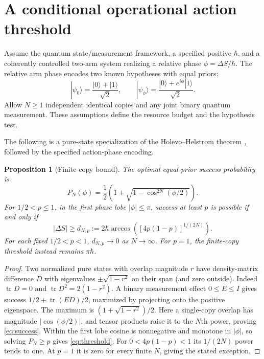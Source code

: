 \documentclass[11pt,a4paper]{article}
\newtheorem{proposition}{Proposition}
\begin{document}
\section{A conditional operational action threshold}
Assume the quantum state/measurement framework, a specified positive $\hbar$,
and a coherently controlled two-arm system realizing a relative phase
$\phi=\Delta S/\hbar$. The relative arm phase encodes two known hypotheses
with equal priors:
\[
 |\psi_0\rangle=\frac{|0\rangle+|1\rangle}{\sqrt2},\qquad
 |\psi_\phi\rangle=\frac{|0\rangle+e^{i\phi}|1\rangle}{\sqrt2}.
\]
Allow $N\ge1$ independent identical copies and any joint binary quantum
measurement. These assumptions define the resource budget and the hypothesis test.

The following is a pure-state specialization of the Holevo--Helstrom theorem
\cite[Theorem 3.4]{Watrous2018}, followed by the specified action-phase encoding.

\begin{proposition}[Finite-copy bound]\label{prop:measurement}
The optimal equal-prior success probability is
\begin{equation}\label{eq:success}
 P_N(\phi)=\frac12\left(1+\sqrt{1-\cos^{2N}(\phi/2)}\right).
\end{equation}
For $1/2<p\le1$, in the first phase lobe $|\phi|\le\pi$, success at least $p$
is possible if and only if
\begin{equation}\label{eq:threshold}
 |\Delta S|\ge d_{N,p}:=
 2\hbar\arccos\left([4p(1-p)]^{1/(2N)}\right).
\end{equation}
For each fixed $1/2<p<1$, $d_{N,p}\to0$ as $N\to\infty$. For $p=1$, the finite-copy
threshold instead remains $\pi\hbar$.
\end{proposition}
\begin{proof}
Two normalized pure states with overlap magnitude $r$ have density-matrix
difference $D$ with eigenvalues $\pm\sqrt{1-r^2}$ on their span (and zero outside).
Indeed $\operatorname{tr}D=0$ and
$\operatorname{tr}D^2=2(1-r^2)$. A binary measurement effect $0\le E\le I$ gives
success $1/2+\operatorname{tr}(ED)/2$, maximized by projecting onto the positive
eigenspace. The maximum is $(1+\sqrt{1-r^2})/2$. Here a single-copy overlap has
magnitude $|\cos(\phi/2)|$, and tensor products raise it to the $N$th power,
proving \eqref{eq:success}. Within the first lobe cosine is nonnegative and
monotone in $|\phi|$, so solving $P_N\ge p$ gives \eqref{eq:threshold}.
For $0<4p(1-p)<1$ its $1/(2N)$ power tends to one. At $p=1$ it is zero for
every finite $N$, giving the stated exception.
\end{proof}
\end{document}
